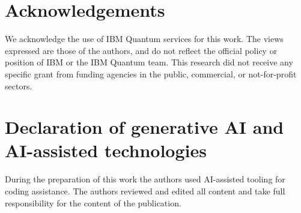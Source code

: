 \documentclass[preprint,11pt]{elsarticle}
\begin{document}
\section*{Acknowledgements}
We acknowledge the use of IBM Quantum services for this work. The views expressed are those of the
authors, and do not reflect the official policy or position of IBM or the IBM Quantum team. This
research did not receive any specific grant from funding agencies in the public, commercial, or
not-for-profit sectors.

\section*{Declaration of generative AI and AI-assisted technologies}
During the preparation of this work the authors used AI-assisted tooling for coding assistance. The
authors reviewed and edited all content and take full responsibility for the content of the
publication.



\end{document}
